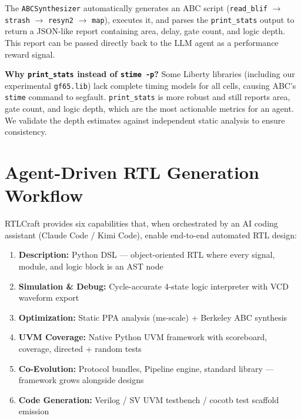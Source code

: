 \documentclass[11pt]{article}
\begin{document}
The \texttt{ABCSynthesizer} automatically generates an ABC script (\texttt{read\_blif} $\rightarrow$ \texttt{strash} $\rightarrow$ \texttt{resyn2} $\rightarrow$ \texttt{map}), executes it, and parses the \texttt{print\_stats} output to return a JSON-like report containing area, delay, gate count, and logic depth. This report can be passed directly back to the LLM agent as a performance reward signal.

\textbf{Why \texttt{print\_stats} instead of \texttt{stime -p}?} Some Liberty libraries (including our experimental \texttt{gf65.lib}) lack complete timing models for all cells, causing ABC's \texttt{stime} command to segfault. \texttt{print\_stats} is more robust and still reports area, gate count, and logic depth, which are the most actionable metrics for an agent. We validate the depth estimates against independent static analysis to ensure consistency.

\section{Agent-Driven RTL Generation Workflow}
\label{sec:cases}

RTLCraft provides six capabilities that, when orchestrated by an AI coding assistant (Claude Code / Kimi Code), enable end-to-end automated RTL design:

\begin{enumerate}
    \item \textbf{Description:} Python DSL --- object-oriented RTL where every signal, module, and logic block is an AST node
    \item \textbf{Simulation \& Debug:} Cycle-accurate 4-state logic interpreter with VCD waveform export
    \item \textbf{Optimization:} Static PPA analysis (ms-scale) + Berkeley ABC synthesis
    \item \textbf{UVM Coverage:} Native Python UVM framework with scoreboard, coverage, directed + random tests
    \item \textbf{Co-Evolution:} Protocol bundles, Pipeline engine, standard library --- framework grows alongside designs
    \item \textbf{Code Generation:} Verilog / SV UVM testbench / cocotb test scaffold emission
\end{enumerate}
\end{document}
